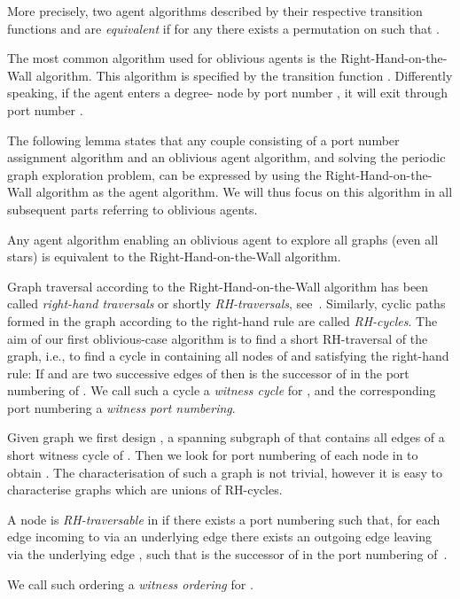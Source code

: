 \documentclass[11pt,envcountsame,oribibl]{llncs}
\begin{document}
More precisely, two agent algorithms described by their respective
transition functions  and  are {\em equivalent} if for any
 there exists a permutation  on  such that
.

The most common algorithm used for oblivious agents is the
Right-Hand-on-the-Wall algorithm. This algorithm is specified by the
transition function . Differently
speaking, if the agent enters a degree- node  by port number
, it will exit  through port number .

The following lemma states that any couple consisting of a port number
assignment algorithm and an oblivious agent algorithm, and solving the
periodic graph exploration problem, can be expressed by using the
Right-Hand-on-the-Wall algorithm as the agent algorithm. We will thus
focus on this algorithm in all subsequent parts referring to oblivious
agents.

\begin{lemma}\label{lem:only-RH}
  Any agent algorithm enabling an oblivious agent to explore all
  graphs (even all stars) is equivalent to the Right-Hand-on-the-Wall
  algorithm.
\end{lemma}



Graph traversal according to the Right-Hand-on-the-Wall
  algorithm has been called {\em right-hand traversals} or shortly {\em RH-traversals},
see~\cite{DJSS05}. Similarly, cyclic paths formed in the graph according
to the right-hand rule are called {\em RH-cycles}.
The aim of our first oblivious-case algorithm is to find a short RH-traversal of the graph, i.e., to find a cycle  in
 containing all nodes of  and satisfying the
right-hand rule: If  and  are two
successive edges of  then  is the successor
of  in the port numbering of . We call such a
cycle a {\em witness cycle} for , and the corresponding port
numbering a {\em witness port numbering}.

Given graph  we first design , a
spanning subgraph of  that contains all edges of
a short witness cycle  of .
Then we look for port numbering of each node in
 to obtain . The
characterisation of such a graph  is not trivial,
however it is easy to characterise
graphs which are unions of RH-cycles.

\begin{definition} A node  is {\em RH-traversable}
in  if there exists a port numbering 
such that, for
each edge  incoming to  via an underlying
edge  there exists an outgoing edge  leaving~ via
the underlying edge , such that  is the successor of  in
the port numbering of~.

We call such ordering a {\em witness ordering} for .
\end{definition}
\end{document}
